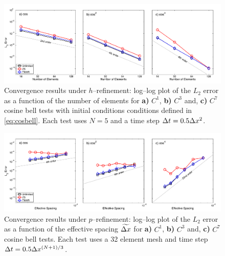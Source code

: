 \documentclass{ametsoc}
\begin{document}

\begin{figure}[t]
\includegraphics[width= \textwidth]{figs/1d/cosbell_hConvg_nodal.pdf}
\caption{Convergence results under $h$--refinement: log--log plot of the $L_2$ error as a function of the number of elements for {\bf a)} $C^1$, {\bf b)} $C^3$ and, {\bf c)} $C^7$ cosine bell tests with initial conditions  conditions defined in \eqref{eq:cosbell}. Each test uses $N=5$ and a time step $\Delta t = 0.5 \Delta x^{2}$. } \label{fig:cosConv-h}
\end{figure}

\begin{figure}[t]
\includegraphics[width=\textwidth]{figs/1d/cosbellConvg_nodal.pdf}
\caption{Convergence results under $p$--refinement: log--log plot of the $L_2$ error as a function of the effective spacing $\widetilde{\Delta x}$ for {\bf a)} $C^1$, {\bf b)} $C^3$ and, {\bf c)} $C^7$ cosine bell tests. Each test uses a 32 element mesh and time step $\Delta t = 0.5 \Delta x^{(N+1)/3}$.} \label{fig:cosConv-p}
\end{figure}
\end{document}
